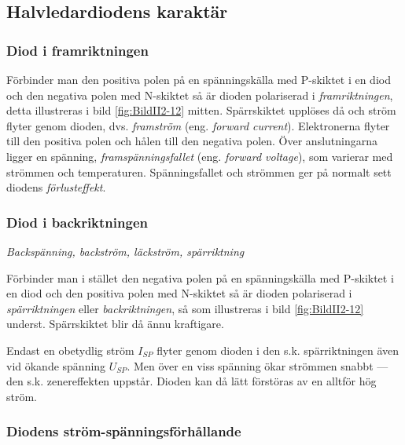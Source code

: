 \subsection{Halvledardiodens karaktär}

\subsubsection{Diod i framriktningen}

Förbinder man den positiva polen på en spänningskälla med P-skiktet i en diod
och den negativa polen med N-skiktet så är dioden polariserad i
\emph{framriktningen}, detta illustreras i bild \ref{fig:BildII2-12} mitten.
Spärrskiktet upplöses då och ström flyter genom dioden, dvs. \emph{framström}
(eng. \emph{forward current}).
Elektronerna flyter till den positiva polen och hålen till den negativa polen.
Över anslutningarna ligger en spänning, \emph{framspänningsfallet}
(eng. \emph{forward voltage}), som varierar med strömmen och temperaturen.
Spänningsfallet och strömmen ger på normalt sett diodens \emph{förlusteffekt}.

\subsubsection{Diod i backriktningen}

\emph{Backspänning, backström, läckström, spärriktning}

Förbinder man i stället den negativa polen på en spänningskälla med P-skiktet i
en diod och den positiva polen med N-skiktet så är dioden polariserad i
\emph{spärriktningen} eller \emph{backriktningen}, så som illustreras i
bild \ref{fig:BildII2-12} underst.
Spärrskiktet blir då ännu kraftigare.

Endast en obetydlig ström \(I_{SP}\) flyter genom dioden i den s.k.
spärriktningen även vid ökande spänning \(U_{SP}\).
Men över en viss spänning ökar strömmen snabbt --- den s.k. zenereffekten
uppstår.
Dioden kan då lätt förstöras av en alltför hög ström.

\subsubsection{Diodens ström-spänningsförhållande}


